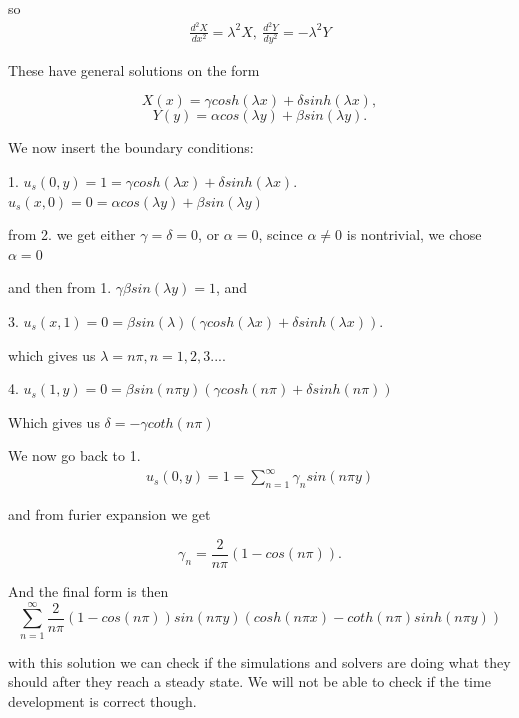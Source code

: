 \documentclass[english,a4paper,12pt]{article}
\begin{document}
so
\begin{align*}
 \frac{d^2 X}{dx^2} = \lambda^2 X,\ \frac{d^2 Y}{dy^2} = -\lambda^2 Y
\end{align*}

These have general solutions on the form

\begin{equation}
 X(x) = \gamma cosh(\lambda x) + \delta sinh(\lambda x),
\end{equation}
\begin{equation}
 Y(y) = \alpha cos(\lambda y) + \beta sin(\lambda y).
\end{equation}

We now insert the boundary conditions:\newline

1. $u_{s}(0,y)= 1 =\gamma cosh(\lambda x) + \delta sinh(\lambda x)$. $u_{s}(x,0) = 0 = \alpha cos(\lambda y) + \beta sin(\lambda y)$\newline

from 2. we get either $\gamma = \delta = 0$, or $\alpha = 0$, scince $\alpha \neq 0$ is nontrivial, we chose $\alpha = 0$

and then from 1. $\gamma\beta sin(\lambda y) = 1$, and

3. $u_{s}(x,1) = 0 = \beta sin(\lambda)(\gamma cosh(\lambda x) + \delta sinh(\lambda x))$.

which gives us $\lambda = n\pi, n = 1,2,3....$ 

4. $u_{s}(1,y) = 0 = \beta sin(n\pi y)(\gamma cosh(n\pi) + \delta sinh(n\pi))$

Which gives us $\delta = - \gamma coth(n\pi)$

We now go back to 1.
\begin{align*}
 u_{s}(0,y) = 1 = \sum_{n=1}^\infty \gamma_n sin(n\pi y)
\end{align*}

and from furier expansion we get 

\begin{equation}
 \gamma_n = \frac{2}{n\pi}(1-cos(n\pi)).
\end{equation}

And the final form is then 
\begin{equation}
 \sum_{n=1}^\infty \frac{2}{n\pi}(1-cos(n\pi))sin(n\pi y)(cosh(n\pi x)-coth(n\pi)sinh(n\pi y))
\end{equation}

with this solution we can check if the simulations and solvers are doing what they should after they reach a steady state. We 
will not be able to check if the time development is correct though.
\end{document}
